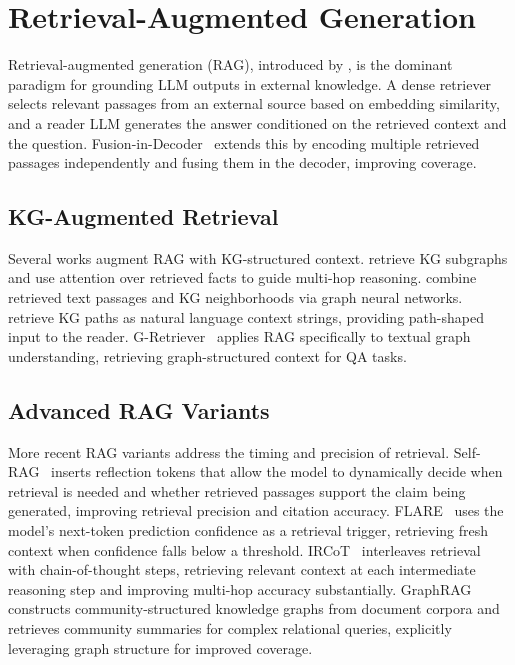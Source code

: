 \section{Retrieval-Augmented Generation}
\label{sec:rag}

Retrieval-augmented generation (RAG), introduced by \citet{lewis2020rag}, is the dominant paradigm for grounding LLM outputs in external knowledge. A dense retriever selects relevant passages from an external source based on embedding similarity, and a reader LLM generates the answer conditioned on the retrieved context and the question. Fusion-in-Decoder~\citep{izacard2021leveraging} extends this by encoding multiple retrieved passages independently and fusing them in the decoder, improving coverage.

\subsection{KG-Augmented Retrieval}

Several works augment RAG with KG-structured context. \citet{he2021multihop} retrieve KG subgraphs and use attention over retrieved facts to guide multi-hop reasoning. \citet{yasunaga2021qagnn} combine retrieved text passages and KG neighborhoods via graph neural networks. \citet{shi2021kgpath} retrieve KG paths as natural language context strings, providing path-shaped input to the reader. G-Retriever~\citep{he2024gretriever} applies RAG specifically to textual graph understanding, retrieving graph-structured context for QA tasks.

\subsection{Advanced RAG Variants}

More recent RAG variants address the timing and precision of retrieval. Self-RAG~\citep{asai2024selfrag} inserts reflection tokens that allow the model to dynamically decide when retrieval is needed and whether retrieved passages support the claim being generated, improving retrieval precision and citation accuracy. FLARE~\citep{jiang2023flare} uses the model's next-token prediction confidence as a retrieval trigger, retrieving fresh context when confidence falls below a threshold. IRCoT~\citep{trivedi2022ircot} interleaves retrieval with chain-of-thought steps, retrieving relevant context at each intermediate reasoning step and improving multi-hop accuracy substantially. GraphRAG~\citep{edge2024graphrag} constructs community-structured knowledge graphs from document corpora and retrieves community summaries for complex relational queries, explicitly leveraging graph structure for improved coverage.

